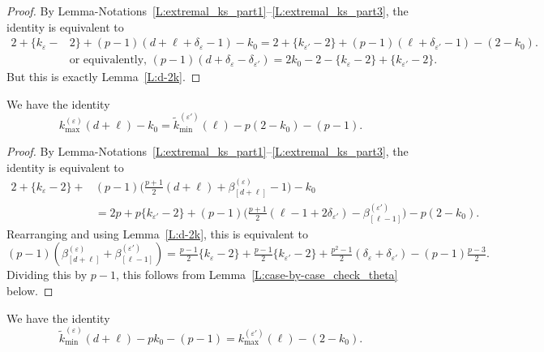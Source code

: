\begin{proof}
    By Lemma-Notations~\ref{L:extremal_ks_part1}--\ref{L:extremal_ks_part3}, the identity is equivalent to
    \begin{align*}
    2+\{k_\varepsilon -&2\} + (p-1)(d+\ell +\delta_\varepsilon -1) -k_0 = 2+\{k_{\varepsilon '}-2\} + (p-1)(\ell + \delta_{\varepsilon'} -1) - (2-k_0).
    \\
    &
    \textrm{or equivalently, }(p-1)(d+\delta_\varepsilon - \delta_{\varepsilon'}) = 2k_0 -2 -\{k_\varepsilon-2\}+\{k_{\varepsilon'}-2\}.
    \end{align*}
    But this is exactly Lemma~\ref{L:d-2k}.
\end{proof}

\begin{lemma}
    \label{L:three_elementary_identities_part2}
    We have the identity
    $$k_{\max}^{(\varepsilon)} (d+\ell) -k_0 = \tilde  k_{\min}^{(\varepsilon')}(\ell) -p (2-k_0)-(p-1).$$
\end{lemma}

\begin{proof}
    By Lemma-Notations~\ref{L:extremal_ks_part1}--\ref{L:extremal_ks_part3}, the identity is equivalent to
    \begin{align*}
    2 +\{k_{\varepsilon} -2\} + &(p-1) \big(\tfrac{p+1}2 (d+\ell) +\beta_{[d+\ell]}^{(\varepsilon)}-1\big) - k_0\\ & =
    2p +p\{k_{\varepsilon'} -2\} + (p-1) \big(\tfrac{p+1}2 ( \ell-1+2\delta_{\varepsilon'})- \beta_{[\ell-1]}^{(\varepsilon')}\big)   -p(2-k_0).
    \end{align*}
    Rearranging and using Lemma~\ref{L:d-2k}, this is equivalent to
    $$  (p-1)(\beta_{[d+\ell]}^{(\varepsilon)}+ \beta_{[\ell-1]}^{(\varepsilon')} )=
    \tfrac{p-1}2\{k_\varepsilon-2\} +\tfrac{p-1}2\{k_{\varepsilon'} - 2\} + \tfrac{p^2-1}2(  \delta_\varepsilon+\delta_{\varepsilon'}) -(p-1)\tfrac{p-3}2.
    $$
    Dividing this by $p-1$, this follows from Lemma~\ref{L:case-by-case_check_theta} below.
\end{proof}

\begin{lemma}
    \label{L:three_elementary_identities_part3}
    We have the identity
    $$\tilde k_{\min}^{(\varepsilon)} (d+\ell) -pk_0 - (p-1) =   k_{\max}^{(\varepsilon')}(\ell) - (2-k_0).$$
\end{lemma}

